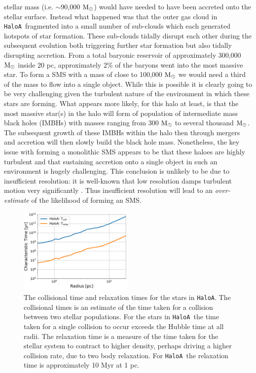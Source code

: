 \documentclass[graphics, twocolumn, usenatbib]{mn2e}
\newcommand{\msolar} {$\rm{M_{\odot}}~$}
\newcommand{\msolarc} {$\rm{M_{\odot}}$}
\newcommand{\ha} {\texttt{HaloA~}}
\newcommand{\hac} {\texttt{HaloA}}
\begin{document}
stellar mass
(i.e. $\sim$90,000 \msolarc) would have needed to have been accreted onto the stellar surface. Instead
what happened was that the outer gas cloud in \ha fragmented into a small number of sub-clouds which
each generated hotspots of star formation. These sub-clouds tidally disrupt each other during the
subsequent evolution both triggering further star formation but also tidally disrupting accretion.
From a total baryonic reservoir of approximately 300,000 \msolar inside 20 pc, approximately 2\% of the baryons went into the most massive star. To form a SMS
with a mass of close to 100,000 \msolar we would need a third of the mass to 
flow into a single object. While this is possible it is clearly going to be 
very challenging given the turbulent nature of the environment in which these stars are forming.
What appears more likely, for this halo at least, is that the 
most massive star(s) in the halo will form of population of intermediate mass black holes
(IMBHs) with masses ranging from 300 \msolar to several thousand \msolarc.
The subsequent
growth of these IMBHs within the halo then through 
mergers and accretion will then slowly build the black hole mass. 
Nonetheless, the key issue with forming a monolithic SMS appears to be that
these haloes are highly turbulent and that sustaining accretion onto a single
object in such an environment is hugely challenging.
This conclusion is unlikely to be due to insufficient resolution: it is
well-known that low resolution damps turbulent motion very significantly
\citep[e.g.][]{Federrath_2010a, Downes_2012}. Thus insufficient resolution
will lead to an {\it over-estimate} of the likelihood of forming an SMS.
\begin{figure}
   \centering 
\includegraphics[width=0.5\textwidth]{FIGURES/CollisionalTime.pdf}
\caption{The collisional time and relaxation times for the stars in \hac. The collisional times is
  an estimate of the time taken for a collision between two stellar populations. For the stars
  in \ha the time taken for a single collision to occur exceeds the Hubble time at all radii.
  The relaxation time is a measure of the time taken for the stellar system to contract to
  higher density, perhaps driving a higher collision rate, due to
  two body relaxation. For \ha the relaxation time is approximately 10 Myr at 1 pc. }
\label{Fig:Collisions}
\end{figure}
\end{document}
